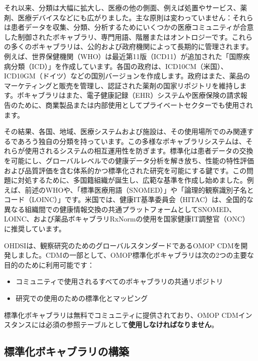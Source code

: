 \documentclass[
  11pt]{book}
\providecommand{\tightlist}{%
  \setlength{\itemsep}{0pt}\setlength{\parskip}{0pt}}
\theoremstyle{definition}
\theoremstyle{definition}
\theoremstyle{definition}
\theoremstyle{definition}
\theoremstyle{remark}
\begin{document}
それ以来、分類は大幅に拡大し、医療の他の側面、例えば処置やサービス、薬剤、医療デバイスなどにも広がりました。主な原則は変わっていません：それらは患者データを収集、分類、分析するためにいくつかの医療コミュニティが合意した制御されたボキャブラリ、専門用語、階層またはオントロジーです。これらの多くのボキャブラリは、公的および政府機関によって長期的に管理されます。例えば、世界保健機関（WHO）は最近第11版（ICD11）が追加された「国際疾病分類（ICD）」を作成しています。各国の政府は、ICD10CM（米国）、ICD10GM（ドイツ）などの国別バージョンを作成します。政府はまた、薬品のマーケティングと販売を管理し、認証された薬剤の国家リポジトリを維持します。ボキャブラリはまた、電子健康記録（EHR）システムや医療保険の請求報告のために、商業製品または内部使用としてプライベートセクターでも使用されます。

その結果、各国、地域、医療システムおよび施設は、その使用場所でのみ関連するであろう独自の分類を持っています。この多様なボキャブラリシステムは、それらが使用されるシステムの相互運用性を防ぎます。標準化は患者データの交換を可能にし、グローバルレベルでの健康データ分析を解き放ち、性能の特性評価および品質評価を含む体系的かつ標準化された研究を可能にする鍵です。この問題に対処するために、多国籍組織が誕生し、広範な基準を作成し始めました。例えば、前述のWHOや、「標準医療用語（SNOMED）」や「論理的観察識別子名とコード（LOINC）」です。米国では、健康IT基準委員会（HITAC）は、全国的な異なる組織間での健康情報交換の共通プラットフォームとしてSNOMED、LOINC、および薬品ボキャブラリRxNormの使用を国家健康IT調整官（ONC）に推奨しています。

OHDSIは、観察研究のためのグローバルスタンダードであるOMOP CDMを開発しました。CDMの一部として、OMOP標準化ボキャブラリは次の2つの主要な目的のために利用可能です：

\begin{itemize}
\tightlist
\item
  コミュニティで使用されるすべてのボキャブラリの共通リポジトリ
\item
  研究での使用のための標準化とマッピング
\end{itemize}

標準化ボキャブラリは無料でコミュニティに提供されており、OMOP CDMインスタンスには必須の参照テーブルとして\textbf{使用しなければなりません}。

\subsection{標準化ボキャブラリの構築}\label{ux6a19ux6e96ux5316ux30dcux30adux30e3ux30d6ux30e9ux30eaux306eux69cbux7bc9}
\end{document}

